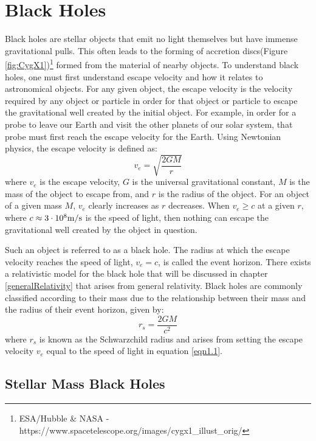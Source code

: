 \documentclass[12pt, oneside]{smuthesis}
\begin{document}
\section{\sc Black Holes} \label{blackHole}

Black holes are stellar objects that emit no light themselves but have immense gravitational pulls. This often leads to the forming of accretion discs(Figure \ref{fig:CygX1})\footnote{ESA/Hubble \& NASA - https://www.spacetelescope.org/images/cygx1\_illust\_orig/} formed from the material of nearby objects. To understand black holes, one must first understand escape velocity and how it relates to astronomical objects. For any given object, the escape velocity is the velocity required by any object or particle in order for that object or particle to escape the gravitational well created by the initial object. For example, in order for a probe to leave our Earth and visit the other planets of our solar system, that probe must first reach the escape velocity for the Earth. Using Newtonian physics, the escape velocity is defined as:
\begin{equation} \label{eqn1.1}
v_{e} = \sqrt{\frac{2GM}{r}}
\end{equation}
where $v_{e}$ is the escape velocity, $G$ is the universal gravitational constant, $M$ is the mass of the object to escape from, and $r$ is the radius of the object. For an object of a given mass $M$, $v_{e}$ clearly increases as $r$ decreases. When $v_{e} \geq c$ at a given $r$, where $c \approx 3\cdot10^{8} \textup{m}/\textup{s}$ is the speed of light, then nothing can escape the gravitational well created by the object in question.

Such an object is referred to as a black hole. The radius at which the escape velocity reaches the speed of light, $v_{e} = c$, is called the event horizon. There exists a relativistic model for the black hole that will be discussed in chapter \ref{generalRelativity} that arises from general relativity. Black holes are commonly classified according to their mass due to the relationship between their mass and the radius of their event horizon, given by:
\begin{equation} \label{eqn1.2}
r_{s} = \frac{2GM}{c^{2}}
\end{equation}
where $r_{s}$ is known as the Schwarzchild radius and arises from setting the escape velocity $v_{e}$ equal to the speed of light in equation \ref{eqn1.1}.

\subsection{\sc Stellar Mass Black Holes} \label{stellarBH}
\end{document}
